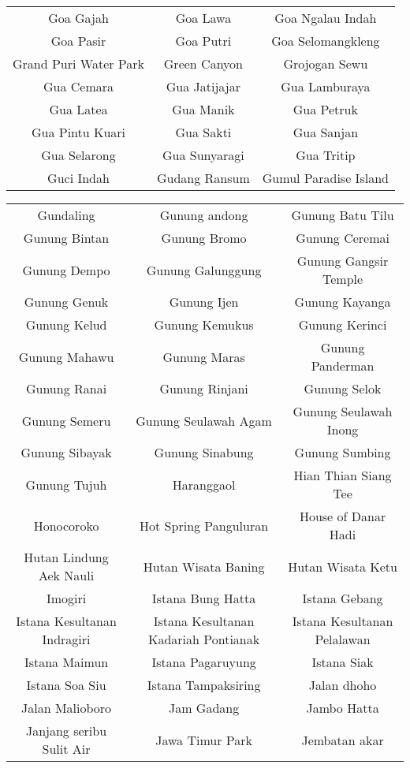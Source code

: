 \begin{table}[H]
\begin{tabular}{ c | c | c }
Goa Gajah & Goa Lawa & Goa Ngalau Indah\\
Goa Pasir & Goa Putri & Goa Selomangkleng\\
Grand Puri Water Park & Green Canyon & Grojogan Sewu\\
Gua Cemara & Gua Jatijajar & Gua Lamburaya\\
Gua Latea & Gua Manik & Gua Petruk\\
Gua Pintu Kuari & Gua Sakti & Gua Sanjan\\
Gua Selarong & Gua Sunyaragi & Gua Tritip\\
Guci Indah & Gudang Ransum & Gumul Paradise Island\\
	\end{tabular}	
\end{table}	
\begin{table}[H]
	\tiny
	\centering
	\begin{tabular}{ c | c | c}
Gundaling & Gunung andong & Gunung Batu Tilu\\
Gunung Bintan & Gunung Bromo & Gunung Ceremai\\
Gunung Dempo & Gunung Galunggung & Gunung Gangsir Temple\\
Gunung Genuk & Gunung Ijen & Gunung Kayanga\\
Gunung Kelud & Gunung Kemukus & Gunung Kerinci\\
Gunung Mahawu & Gunung Maras & Gunung Panderman\\
Gunung Ranai & Gunung Rinjani & Gunung Selok\\
Gunung Semeru & Gunung Seulawah Agam & Gunung Seulawah Inong\\
Gunung Sibayak & Gunung Sinabung & Gunung Sumbing\\
Gunung Tujuh & Haranggaol & Hian Thian Siang Tee\\
Honocoroko & Hot Spring Panguluran & House of Danar Hadi\\
Hutan Lindung Aek Nauli & Hutan Wisata Baning & Hutan Wisata Ketu\\
Imogiri & Istana Bung Hatta & Istana Gebang\\
Istana Kesultanan Indragiri & Istana Kesultanan Kadariah Pontianak & Istana Kesultanan Pelalawan\\
Istana Maimun & Istana Pagaruyung & Istana Siak\\
Istana Soa Siu & Istana Tampaksiring & Jalan dhoho\\
Jalan Malioboro & Jam Gadang & Jambo Hatta\\
Janjang seribu Sulit Air & Jawa Timur Park & Jembatan akar\\

\end{tabular}
\end{table}
